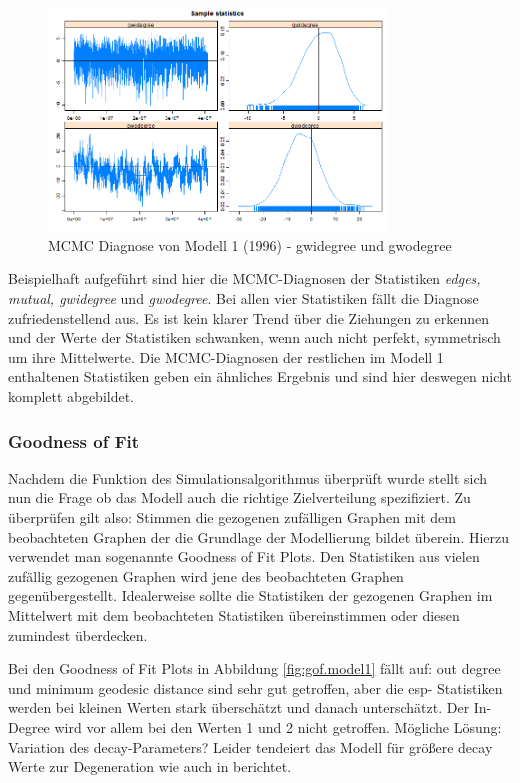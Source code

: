 \documentclass[a4paper,ngerman,oneside,titlepage,bibliography=totoc,11pt]{scrreprt}
\begin{document}
	\begin{figure}[h]
	\centering
		\includegraphics[width=0.8\textwidth]{Grafiken/mcmc_diag2.png}
	\caption{MCMC Diagnose von Modell 1 (1996) - gwidegree und gwodegree}
	\end{figure}
Beispielhaft aufgeführt sind hier die MCMC-Diagnosen der Statistiken \emph{edges, mutual, gwidegree} und \emph{gwodegree}. Bei allen vier Statistiken fällt die Diagnose zufriedenstellend aus. Es ist kein klarer Trend über die Ziehungen zu erkennen und der Werte der Statistiken schwanken, wenn auch nicht perfekt, symmetrisch um ihre Mittelwerte. Die MCMC-Diagnosen der restlichen im Modell 1 enthaltenen Statistiken geben ein ähnliches Ergebnis und sind hier deswegen nicht komplett abgebildet.

\subsubsection{Goodness of Fit}
Nachdem die Funktion des Simulationsalgorithmus überprüft wurde stellt sich nun die Frage ob das Modell auch die richtige Zielverteilung spezifiziert. Zu überprüfen gilt also: Stimmen die gezogenen zufälligen Graphen mit dem beobachteten Graphen der die Grundlage der Modellierung bildet überein. Hierzu verwendet man sogenannte Goodness of Fit Plots. Den Statistiken aus vielen zufällig gezogenen Graphen wird jene des beobachteten Graphen gegenübergestellt. Idealerweise sollte die Statistiken der gezogenen Graphen im Mittelwert mit dem beobachteten Statistiken übereinstimmen oder diesen zumindest überdecken. 


Bei den Goodness of Fit Plots in Abbildung \ref{fig:gof.model1} fällt auf: out degree und minimum geodesic distance sind sehr gut getroffen, aber die esp- Statistiken werden bei kleinen Werten stark überschätzt und danach unterschätzt. Der In-Degree wird vor allem bei den Werten 1 und 2 nicht getroffen. 
Mögliche Lösung: Variation des decay-Parameters? Leider tendeiert das Modell für größere decay Werte zur Degeneration wie auch in \citet{goodreau2008statnet} berichtet.
\end{document}

